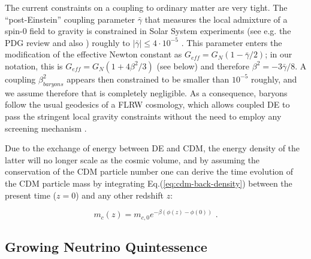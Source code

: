 The current constraints on a coupling to ordinary matter are very
tight. The ``post-Einstein'' coupling parameter $\bar{\gamma}$
that measures the local admixture of a spin-0 field to gravity is
constrained in Solar System experiments (see e.g. the PDG review \cite{Agashe:2014kda}
and also \citep{Will_2005,Bertotti_Iess_Tortora_2003}) roughly to
$|\bar{\gamma}|\le4\cdot10^{-5}$ . This parameter enters the modification
of the effective Newton constant as $G_{eff}=G_{N}(1-\bar{\gamma}/2)$;
in our notation, this is $G_{eff}=G_{N}(1+4\beta^{2}/3)$ (see below)
and therefore $\beta^{2}=-3\bar{\gamma}/8$. A coupling $\beta_{baryons}^{2}$
appears then constrained to be smaller than $10^{-5}$ roughly, and
we assume therefore that is completely negligible. As a consequence,
baryons follow the usual geodesics of a FLRW cosmology, which allows
coupled DE to pass the stringent local gravity constraints without
the need to employ any screening mechanism \citep{2015arXiv150203888H}.

Due to the exchange of energy between DE and CDM, the energy density
of the latter will no longer scale as the cosmic volume, and by assuming
the conservation of the CDM particle number one can derive the time
evolution of the CDM particle mass by integrating Eq.(\ref{eq:cdm-back-density})
between the present time ($z=0$) and any other redshift $z$:

\begin{equation}
m_{c}(z)=m_{c,0}e^{-\beta(\phi(z)-\phi(0))}\,\,.
\end{equation}


\subsection{Growing Neutrino Quintessence \label{sub:GNQ}}

